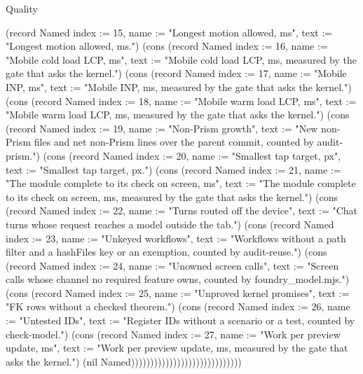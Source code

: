 \begin{lexlean}{Quality}
\begin{semanticmodule}
{(record Named {index := 15, name := "Longest motion allowed, ms", text := "Longest motion allowed, ms."}) (cons (record Named {index := 16, name := "Mobile cold load LCP, ms", text := "Mobile cold load LCP, ms, measured by the gate that asks the kernel."}) (cons (record Named {index := 17, name := "Mobile INP, ms", text := "Mobile INP, ms, measured by the gate that asks the kernel."}) (cons (record Named {index := 18, name := "Mobile warm load LCP, ms", text := "Mobile warm load LCP, ms, measured by the gate that asks the kernel."}) (cons (record Named {index := 19, name := "Non-Prism growth", text := "New non-Prism files and net non-Prism lines over the parent commit, counted by audit-prism."}) (cons (record Named {index := 20, name := "Smallest tap target, px", text := "Smallest tap target, px."}) (cons (record Named {index := 21, name := "The module complete to its check on screen, ms", text := "The module complete to its check on screen, ms, measured by the gate that asks the kernel."}) (cons (record Named {index := 22, name := "Turns routed off the device", text := "Chat turns whose request reaches a model outside the tab."}) (cons (record Named {index := 23, name := "Unkeyed workflows", text := "Workflows without a path filter and a hashFiles key or an exemption, counted by audit-reuse."}) (cons (record Named {index := 24, name := "Unowned screen calls", text := "Screen calls whose channel no required feature owns, counted by foundry_model.mjs."}) (cons (record Named {index := 25, name := "Unproved kernel promises", text := "FK rows without a checked theorem."}) (cons (record Named {index := 26, name := "Untested IDs", text := "Register IDs without a scenario or a test, counted by check-model."}) (cons (record Named {index := 27, name := "Work per preview update, ms", text := "Work per preview update, ms, measured by the gate that asks the kernel."}) (nil Named)))))))))))))))))))))))))))))
}


\end{semanticmodule}
\end{lexlean}
